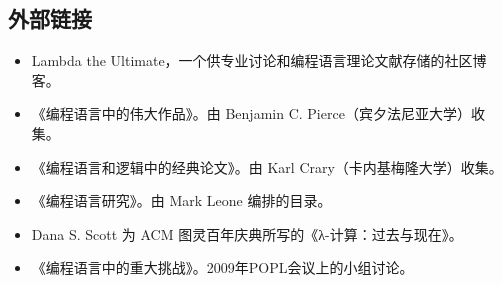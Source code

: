 \subsection{外部链接}
\begin{itemize}
\item Lambda the Ultimate，一个供专业讨论和编程语言理论文献存储的社区博客。
\item 《编程语言中的伟大作品》。由 Benjamin C. Pierce（宾夕法尼亚大学）收集。  
\item 《编程语言和逻辑中的经典论文》。由 Karl Crary（卡内基梅隆大学）收集。  
\item 《编程语言研究》。由 Mark Leone 编排的目录。  
\item Dana S. Scott 为 ACM 图灵百年庆典所写的《λ-计算：过去与现在》。  
\item 《编程语言中的重大挑战》。2009年POPL会议上的小组讨论。
\end{itemize}